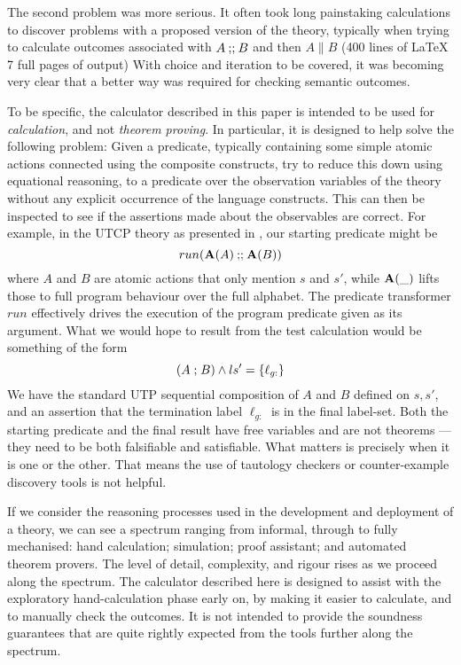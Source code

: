 The second problem was more serious.
It often took long painstaking calculations to discover problems
with a proposed version of the theory,
typically when trying to calculate outcomes associated with
$A \mathbin{\mathbf{;\!;}} B$ and then  $A \parallel B$
(400 lines of \LaTeX\,7 full pages of output)
With choice and iteration to be covered,
it was becoming very clear that a better way was required
for checking semantic outcomes.

To be specific, the calculator described in this paper
is intended to be used for \emph{calculation}, and not \emph{theorem proving}.
In particular, it is designed to help solve the following problem:
Given a predicate, typically containing some simple
atomic actions connected using the composite constructs,
try to reduce this down
using equational reasoning,
to a predicate over the observation
variables of the theory without any explicit occurrence of the language constructs.
This can then be inspected to see if the assertions made about the observables
are correct.
For example, in the UTCP theory as presented in \cite{conf/tase/BMN16},
our starting predicate might be
\[
  run(\mathbf{A}(A) \mathbin{\mathbf{;\!;}} \mathbf{A}(B))
\]
where $A$ and $B$ are atomic actions that only mention $s$ and $s'$,
while $\mathbf{A}(\_)$ lifts those to full program behaviour over the full alphabet.
The predicate transformer $run$ effectively drives the execution
of the program predicate given as its argument.
What we would hope to result from the test calculation would be
something of the form
\[
  (A \mathrel{;} B) \land ls' = \{{\ell_{g:}}\}
\]
We have the standard UTP sequential composition of $A$ and $B$ defined on $s,s'$,
and an assertion that the termination label $\ell_{g:}$ is in the final label-set.
Both the starting predicate and the final result have free variables
and are not theorems
---they need to be both falsifiable and satisfiable.
What matters is precisely when it is one or the other.
That means the use of tautology checkers or counter-example discovery tools
is not helpful.


If we consider the reasoning processes used in the development
and deployment of a theory, we can see a spectrum ranging from informal,
through to fully mechanised: hand calculation; simulation; proof assistant;
and automated theorem provers.
The level of detail, complexity, and rigour rises as we proceed along the spectrum.
The calculator described here is designed
to assist with the exploratory hand-calculation phase early on,
by making it easier to calculate, and to manually check the outcomes.
It is not intended to provide the soundness guarantees that are quite rightly
expected from the tools further along the spectrum.


